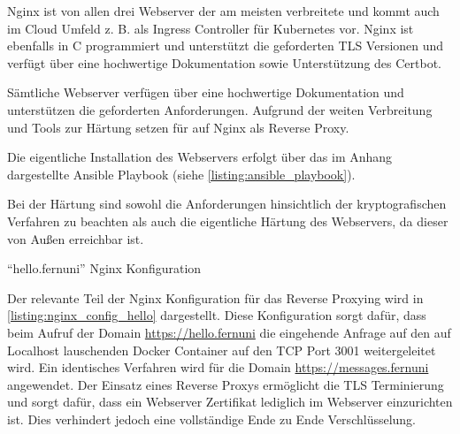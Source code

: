 Nginx ist von allen drei Webserver der am meisten verbreitete und kommt auch im Cloud Umfeld z. B. als Ingress Controller für Kubernetes vor. Nginx ist ebenfalls in C programmiert und unterstützt die geforderten \ac{TLS} Versionen und verfügt über eine hochwertige Dokumentation sowie Unterstützung des Certbot.

Sämtliche Webserver verfügen über eine hochwertige Dokumentation und unterstützen die geforderten Anforderungen. Aufgrund der weiten Verbreitung und Tools zur Härtung setzen für auf Nginx als Reverse Proxy.

Die eigentliche Installation des Webservers erfolgt über das im Anhang dargestellte Ansible Playbook (siehe \autoref{listing:ansible_playbook}).

Bei der Härtung sind sowohl die Anforderungen hinsichtlich der kryptografischen Verfahren zu beachten als auch die eigentliche Härtung des Webservers, da dieser von Außen erreichbar ist.




\begin{listing}[ht]
    \caption{\enquote{hello.fernuni} Nginx Konfiguration}
    \label{listing:nginx_config_hello}
\end{listing}

Der relevante Teil der Nginx Konfiguration für das Reverse Proxying wird in \autoref{listing:nginx_config_hello} dargestellt. Diese Konfiguration sorgt dafür, dass beim Aufruf der Domain \url{https://hello.fernuni} die eingehende Anfrage auf den auf Localhost lauschenden Docker Container auf den \ac{TCP} Port 3001 weitergeleitet wird. Ein identisches Verfahren wird für die Domain \url{https://messages.fernuni} angewendet. Der Einsatz eines Reverse Proxys ermöglicht die TLS Terminierung und sorgt dafür, dass ein Webserver Zertifikat lediglich im Webserver einzurichten ist. Dies verhindert jedoch eine vollständige Ende zu Ende Verschlüsselung.

